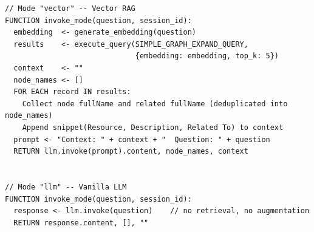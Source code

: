\begin{lstlisting}[caption={Pseudokode \textit{invoker} \texttt{invoke\_mode} untuk mode Vector RAG dan Vanilla LLM}, label={lst:baseline-invokers}, frame=single, captionpos=t]
// Mode "vector" -- Vector RAG
FUNCTION invoke_mode(question, session_id):
  embedding  <- generate_embedding(question)
  results    <- execute_query(SIMPLE_GRAPH_EXPAND_QUERY,
                              {embedding: embedding, top_k: 5})
  context    <- ""
  node_names <- []
  FOR EACH record IN results:
    Collect node fullName and related fullName (deduplicated into node_names)
    Append snippet(Resource, Description, Related To) to context
  prompt <- "Context: " + context + "  Question: " + question
  RETURN llm.invoke(prompt).content, node_names, context


// Mode "llm" -- Vanilla LLM
FUNCTION invoke_mode(question, session_id):
  response <- llm.invoke(question)    // no retrieval, no augmentation
  RETURN response.content, [], ""
\end{lstlisting}
